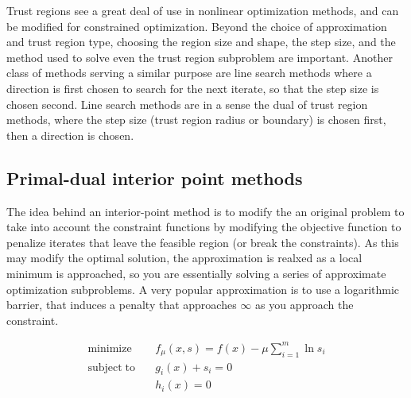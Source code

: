Trust regions see a great deal of use in nonlinear optimization methods, and can be modified for constrained optimization. Beyond the choice of approximation and trust region type, choosing the region size and shape, the step size, and the method used to solve even the trust region subproblem are important. Another class of methods serving a similar purpose are line search methods where a direction is first chosen to search for the next iterate, so that the step size is chosen second. Line search methods are in a sense the dual of trust region methods, where the step size (trust region radius or boundary) is chosen first, then a direction is chosen.

\subsection{Primal-dual interior point methods} \label{ssec:interiorPoint}
The idea behind an interior-point method is to modify the an original problem to take into account the constraint functions by modifying the objective function to penalize iterates that leave the feasible region (or break the constraints). As this may modify the optimal solution, the approximation is realxed as a local minimum is approached, so you are essentially solving a series of approximate optimization subproblems. A very popular approximation is to use a logarithmic barrier, that induces a penalty that approaches $\infty$ as you approach the constraint.

\begin{align}
\mathrm{minimize} \quad & f_\mu(x,s) = f(x) - \mu \sum_{i=1}^{m} \ln s_i \nonumber \\
\mathrm{subject\;to} \quad & g_i(x) + s_i = 0 \\
                           & h_i(x) = 0 \nonumber
\end{align}

